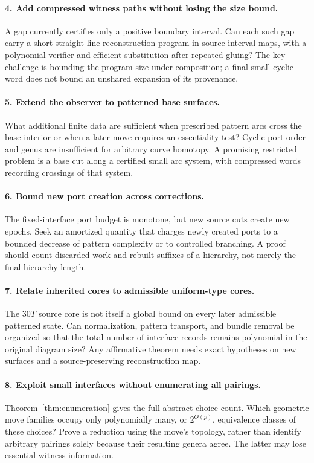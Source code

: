 \documentclass[11pt]{article}
\theoremstyle{definition}
\theoremstyle{remark}\newtheorem{remark}[theorem]{Remark}
\begin{document}
\paragraph{4. Add compressed witness paths without losing the size bound.}
A gap currently certifies only a positive boundary interval. Can each such gap carry a short straight-line reconstruction program in source interval maps, with a polynomial verifier and efficient substitution after repeated gluing? The key challenge is bounding the program size under composition; a final small cyclic word does not bound an unshared expansion of its provenance.

\paragraph{5. Extend the observer to patterned base surfaces.}
What additional finite data are sufficient when prescribed pattern arcs cross the base interior or when a later move requires an essentiality test? Cyclic port order and genus are insufficient for arbitrary curve homotopy. A promising restricted problem is a base cut along a certified small arc system, with compressed words recording crossings of that system.

\paragraph{6. Bound new port creation across corrections.}
The fixed-interface port budget is monotone, but new source cuts create new epochs. Seek an amortized quantity that charges newly created ports to a bounded decrease of pattern complexity or to controlled branching. A proof should count discarded work and rebuilt suffixes of a hierarchy, not merely the final hierarchy length.

\paragraph{7. Relate inherited cores to admissible uniform-type cores.}
The $30T$ source core is not itself a global bound on every later admissible patterned state. Can normalization, pattern transport, and bundle removal be organized so that the total number of interface records remains polynomial in the original diagram size? Any affirmative theorem needs exact hypotheses on new surfaces and a source-preserving reconstruction map.

\paragraph{8. Exploit small interfaces without enumerating all pairings.}
Theorem~\ref{thm:enumeration} gives the full abstract choice count. Which geometric move families occupy only polynomially many, or $2^{O(p)}$, equivalence classes of these choices? Prove a reduction using the move's topology, rather than identify arbitrary pairings solely because their resulting genera agree. The latter may lose essential witness information.
\end{document}
